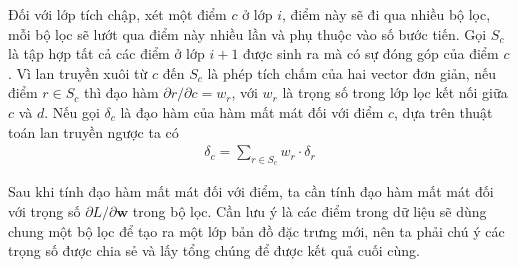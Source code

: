 Đối với lớp tích chập, xét một điểm $c$ ở lớp $i$, điểm này sẽ đi qua nhiều bộ lọc, mỗi bộ lọc sẽ lướt qua điểm này nhiều lần và phụ thuộc vào số bước tiến. Gọi $S_c$ là tập hợp tất cả các điểm ở lớp $i+1$ được sinh ra mà có sự đóng góp của điểm $c$. Vì lan truyền xuôi từ $c$ đến $S_c$ là phép tích chấm của hai vector đơn giản, nếu điểm $r\in S_c$ thì đạo hàm $\partial r/\partial c=w_r$, với $w_r$ là trọng số trong lớp lọc kết nối giữa $c$ và $d$. Nếu gọi $\delta_c$ là đạo hàm của hàm mất mát đối với điểm $c$, dựa trên thuật toán lan truyền ngược ta có
\begin{align}
    \label{equation:cnn-backpropagation}
    \delta_c=\sum_{r\in S_c}w_r\cdot\delta_r
\end{align}

Sau khi tính đạo hàm mất mát đối với điểm, ta cần tính đạo hàm mất mát đối với trọng số $\partial L/\partial\mathbf w$ trong bộ lọc. Cần lưu ý là các điểm trong dữ liệu sẽ dùng chung một bộ lọc để tạo ra một lớp bản đồ đặc trưng mới, nên ta phải chú ý các trọng số được chia sẻ và lấy tổng chúng để được kết quả cuối cùng.

